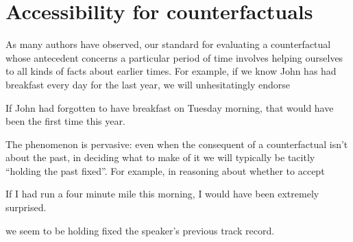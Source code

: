 \documentclass[If.tex]{subfiles}
\begin{document}
\section{Accessibility for counterfactuals}\label{sect:cf}
As many authors have observed, our standard for evaluating a counterfactual whose antecedent concerns a particular period of time involves helping ourselves to all kinds of facts about earlier times. For example, if we know John has had breakfast every day for the last year, we will unhesitatingly endorse
\begin{prop}
	\nitem \label{breakfast}
		If John had forgotten to have breakfast on Tuesday morning, that would have been the first time this year.
\end{prop}
The phenomenon is pervasive: even when the consequent of a counterfactual isn't about the past, in deciding what to make of it we will typically be tacitly “holding the past fixed”. For example, in reasoning about whether to accept
\begin{prop}
	\nitem 
	If I had run a four minute mile this morning, I would have been extremely surprised.
\end{prop}
we seem to be holding fixed the speaker's previous track record.
\end{document}
